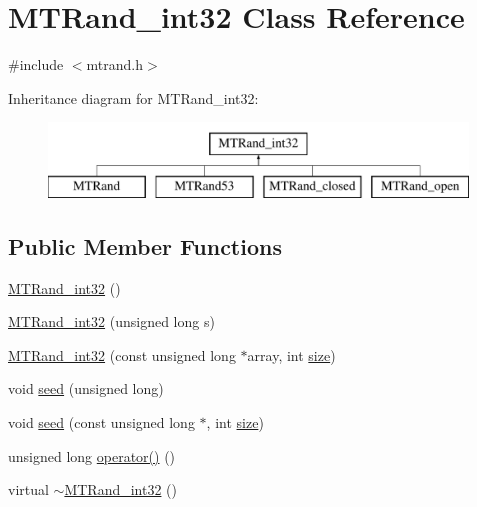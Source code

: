 \hypertarget{class_m_t_rand__int32}{\section{M\-T\-Rand\-\_\-int32 Class Reference}
\label{class_m_t_rand__int32}
}


{\ttfamily \#include $<$mtrand.\-h$>$}

Inheritance diagram for M\-T\-Rand\-\_\-int32\-:\begin{figure}[H]
\begin{center}
\leavevmode
\includegraphics[height=2.000000cm]{class_m_t_rand__int32}
\end{center}
\end{figure}
\subsection*{Public Member Functions}
\begin{DoxyCompactItemize}
\item 
\hyperlink{class_m_t_rand__int32_a034f223c086f5368bd220b02f2cc12a8}{M\-T\-Rand\-\_\-int32} ()
\item 
\hyperlink{class_m_t_rand__int32_ad30f7c63a6f1fb3c3b76b8ce6ffa0206}{M\-T\-Rand\-\_\-int32} (unsigned long s)
\item 
\hyperlink{class_m_t_rand__int32_a19acddb3910a7282517b2ffc398b92b4}{M\-T\-Rand\-\_\-int32} (const unsigned long $\ast$array, int \hyperlink{crea__e__controlla__i__catalizzatori_8m_ae113ea7f9e515a12ac4b5595c6faf61e}{size})
\item 
void \hyperlink{class_m_t_rand__int32_a0c57076fe30358e0700a7ce1baa0ea27}{seed} (unsigned long)
\item 
void \hyperlink{class_m_t_rand__int32_a3cabc1e3445716236a570ffd2f69686d}{seed} (const unsigned long $\ast$, int \hyperlink{crea__e__controlla__i__catalizzatori_8m_ae113ea7f9e515a12ac4b5595c6faf61e}{size})
\item 
unsigned long \hyperlink{class_m_t_rand__int32_ad7fe22190d0411c6dac8e6f471633aa4}{operator()} ()
\item 
virtual \hyperlink{class_m_t_rand__int32_a364900abea0758d070ce89922159923a}{$\sim$\-M\-T\-Rand\-\_\-int32} ()
\end{DoxyCompactItemize}
